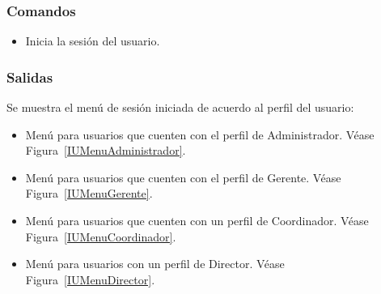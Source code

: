 \subsubsection{Comandos}
\begin{itemize}
 \item {} Inicia la sesión del usuario.

\end{itemize}

\subsubsection{Salidas}
Se muestra el menú de sesión iniciada de acuerdo al perfil del usuario:
\begin{itemize}
 \item Menú para usuarios que cuenten con el perfil de Administrador. Véase Figura~\ref{IUMenuAdministrador}.

 \item Menú para usuarios que cuenten con el perfil de Gerente. Véase Figura~\ref{IUMenuGerente}.

 \item Menú para usuarios que cuenten con un perfil de Coordinador. Véase Figura~\ref{IUMenuCoordinador}.

 \item Menú para usuarios  con un perfil de Director. Véase Figura~\ref{IUMenuDirector}.

\end{itemize}
















